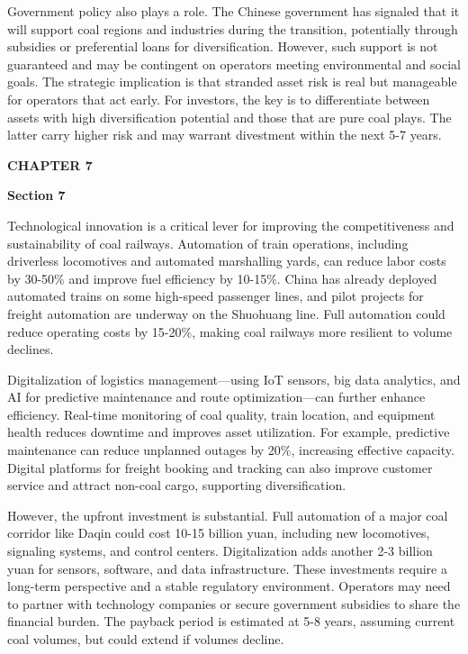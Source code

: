 \documentclass[10pt,a4paper]{article}
\begin{document}
{\small {\small Government policy also plays a role. The Chinese government has signaled that it will support coal regions and industries during the transition, potentially through subsidies or preferential loans for diversification. However, such support is not guaranteed and may be contingent on operators meeting environmental and social goals. The strategic implication is that stranded asset risk is real but manageable for operators that act early. For investors, the key is to differentiate between assets with high diversification potential and those that are pure coal plays. The latter carry higher risk and may warrant divestment within the next 5-7 years.}}

\clearpage
{\textcolor{BOBlue}{\scriptsize\bfseries CHAPTER 7}}\par\vspace{-1pt}
{\Large\sffamily\bfseries\color{BONavy} Section 7}\par\vspace{4pt}
{\small Technological innovation is a critical lever for improving the competitiveness and sustainability of coal railways. Automation of train operations, including driverless locomotives and automated marshalling yards, can reduce labor costs by 30-50\% and improve fuel efficiency by 10-15\%. China has already deployed automated trains on some high-speed passenger lines, and pilot projects for freight automation are underway on the Shuohuang line. Full automation could reduce operating costs by 15-20\%, making coal railways more resilient to volume declines.}

{\small Digitalization of logistics management—using IoT sensors, big data analytics, and AI for predictive maintenance and route optimization—can further enhance efficiency. Real-time monitoring of coal quality, train location, and equipment health reduces downtime and improves asset utilization. For example, predictive maintenance can reduce unplanned outages by 20\%, increasing effective capacity. Digital platforms for freight booking and tracking can also improve customer service and attract non-coal cargo, supporting diversification.}

{\small However, the upfront investment is substantial. Full automation of a major coal corridor like Daqin could cost 10-15 billion yuan, including new locomotives, signaling systems, and control centers. Digitalization adds another 2-3 billion yuan for sensors, software, and data infrastructure. These investments require a long-term perspective and a stable regulatory environment. Operators may need to partner with technology companies or secure government subsidies to share the financial burden. The payback period is estimated at 5-8 years, assuming current coal volumes, but could extend if volumes decline.}
\vspace{3pt}\noindent{}\vspace{4pt}
\end{document}
